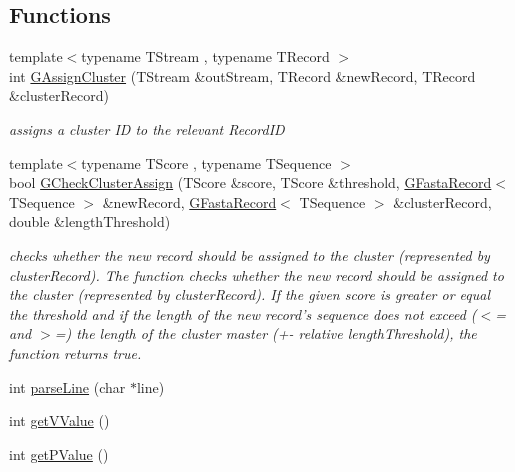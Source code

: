 \subsection*{Functions}
\begin{DoxyCompactItemize}
\item 
{\footnotesize template$<$typename T\-Stream , typename T\-Record $>$ }\\int \hyperlink{namespaceseqan_a845eac8229b25534b1893d9547ff86db}{G\-Assign\-Cluster} (T\-Stream \&out\-Stream, T\-Record \&new\-Record, T\-Record \&cluster\-Record)
\begin{DoxyCompactList}\small\item\em assigns a cluster I\-D to the relevant Record\-I\-D \end{DoxyCompactList}\item 
{\footnotesize template$<$typename T\-Score , typename T\-Sequence $>$ }\\bool \hyperlink{namespaceseqan_aeda48428fe6fb5b47547739a2e304d55}{G\-Check\-Cluster\-Assign} (T\-Score \&score, T\-Score \&threshold, \hyperlink{structseqan_1_1_g_fasta_record}{G\-Fasta\-Record}$<$ T\-Sequence $>$ \&new\-Record, \hyperlink{structseqan_1_1_g_fasta_record}{G\-Fasta\-Record}$<$ T\-Sequence $>$ \&cluster\-Record, double \&length\-Threshold)
\begin{DoxyCompactList}\small\item\em checks whether the new record should be assigned to the cluster (represented by cluster\-Record). The function checks whether the new record should be assigned to the cluster (represented by cluster\-Record). If the given score is greater or equal the threshold and if the length of the new record's sequence does not exceed ($<$= and $>$=) the length of the cluster master (+-\/ relative length\-Threshold), the function returns true. \end{DoxyCompactList}\item 
int \hyperlink{namespaceseqan_abfc1b9b4fd3e0c63871678c69eab5bf2}{parse\-Line} (char $\ast$line)
\item 
int \hyperlink{namespaceseqan_abfe039b148512fc0d59f04e901432c92}{get\-V\-Value} ()
\item 
int \hyperlink{namespaceseqan_a943905857877eecc596a716ee29e2d63}{get\-P\-Value} ()
\end{DoxyCompactItemize}



